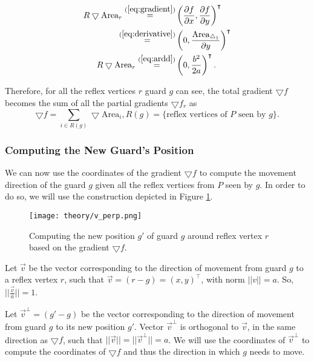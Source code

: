 \begin{align*}
    R\bigtriangledown \text{Area}_r \overset{(\ref{eq:gradient})}{=} &\left(\frac{\partial f}{\partial x}, \frac{\partial f}{\partial y}\right)^\intercal \\
    \overset{(\ref{eq:derivative})}{=} &\left(0, \frac{\text{Area}_{\triangle_1}}{\partial y}\right)^\intercal \\
    R\bigtriangledown \text{Area}_r \overset{(\ref{eq:ardd})}{=} &\left(0, \frac{b^2}{2a}\right)^\intercal.
\end{align*}


Therefore, for all the reflex vertices $r$ guard $g$ can see, the total gradient $\bigtriangledown f$ becomes the sum of all the partial gradients $\bigtriangledown f_r$ as $$\bigtriangledown f = \sum_{i \in R(g)} \bigtriangledown \text{Area}_i, R(g) = \{\text{reflex vertices of } P \text{ seen by }g\}.$$

\subsubsection{Computing the New Guard's Position}
We can now use the coordinates of the gradient $\bigtriangledown f$ to compute the movement direction of the guard $g$ given all the reflex vertices from $P$ seen by $g$. In order to do so, we will use the construction depicted in Figure \ref{fig:vperp}. 

\begin{figure}[h!]
    \centering
    \texttt{[image: theory/v\_perp.png]}
    \caption{Computing the new position $g'$ of guard $g$ around reflex vertex $r$ based on the gradient $\bigtriangledown f$.}
    \label{fig:vperp}
\end{figure}

Let $\vec v$ be the vector corresponding to the direction of movement from guard $g$ to a reflex vertex $r$, such that $\vec{v} = (r - g) = (x, y)^\intercal$, with norm $||v|| = a$. So, $||\frac{\vec v}{a}|| = 1$.

Let $\vec{v}^\perp  = (g' - g)$ be the vector corresponding to the direction of movement from guard $g$ to its new position $g'$. Vector $\vec v^\perp$ is orthogonal to $\vec{v}$, in the same direction as $\bigtriangledown f$, such that $||\vec{v}|| = ||\vec{v}^\perp|| = a$. We will use the coordinates of $\vec{v}^\perp$ to compute the coordinates of $\bigtriangledown f$ and thus the direction in which $g$ needs to move.

